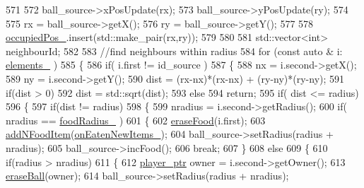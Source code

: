 \begin{DoxyCode}
571 
572         ball\_source->xPosUpdate(rx);
573         ball\_source->yPosUpdate(ry);
574 
575         rx = ball\_source->getX();
576         ry = ball\_source->getY();
577 
578         \hyperlink{classwebsocket_1_1GameBoard_aca1010defacfdd0ea5f032035ce7105e}{occupiedPos\_}.insert(std::make\_pair(rx,ry));
579 
580 
581         std::vector<int> neighbourId;
582 
583         \textcolor{comment}{//find neighbours within radius}
584         \textcolor{keywordflow}{for} (\textcolor{keyword}{const} \textcolor{keyword}{auto} & i: \hyperlink{classwebsocket_1_1GameBoard_a56fd12d10af951e1f6a42a18f4ccfe35}{elements\_} )
585         \{
586             \textcolor{keywordflow}{if}( i.first != id\_source )
587             \{
588                 nx = i.second->getX();
589                 ny = i.second->getY();
590                 dist = (rx-nx)*(rx-nx) + (ry-ny)*(ry-ny);
591                 \textcolor{keywordflow}{if}(dist > 0)
592                     dist = std::sqrt(dist);
593                 \textcolor{keywordflow}{else}
594                     \textcolor{keywordflow}{return};
595                 \textcolor{keywordflow}{if}( dist <= radius)
596                 \{
597                     \textcolor{keywordflow}{if}(dist != radius)
598                     \{
599                         nradius = i.second->getRadius();
600                         \textcolor{keywordflow}{if}( nradius == \hyperlink{classwebsocket_1_1GameBoard_a7277b9cbeca558d4bcfad3c24d185336}{foodRadius\_} )
601                         \{
602                             \hyperlink{classwebsocket_1_1GameBoard_a9bf63429b6e4ef6cb652eab0224fba4f}{eraseFood}(i.first);
603                             \hyperlink{classwebsocket_1_1GameBoard_a4bcaa4bcf0a260efa6baffec4e72990e}{addNFoodItem}(\hyperlink{classwebsocket_1_1GameBoard_a8fe312bcfc33ae3d624a0fdb02f40622}{onEatenNewItems\_});   
604                             ball\_source->setRadius(radius + nradius);
605                             ball\_source->incFood();
606                             \textcolor{keywordflow}{break};
607                         \}
608                         \textcolor{keywordflow}{else}
609                         \{
610                             \textcolor{keywordflow}{if}(radius > nradius)
611                             \{
612                                \hyperlink{namespacewebsocket_aec8d52893bdf524a1412533a63b006a3}{player\_ptr} owner = i.second->getOwner();
613                                \hyperlink{classwebsocket_1_1GameBoard_ac9130252983df425bcefd450f4aa8742}{eraseBall}(owner);
614                                ball\_source->setRadius(radius + nradius);

\end{DoxyCode}
